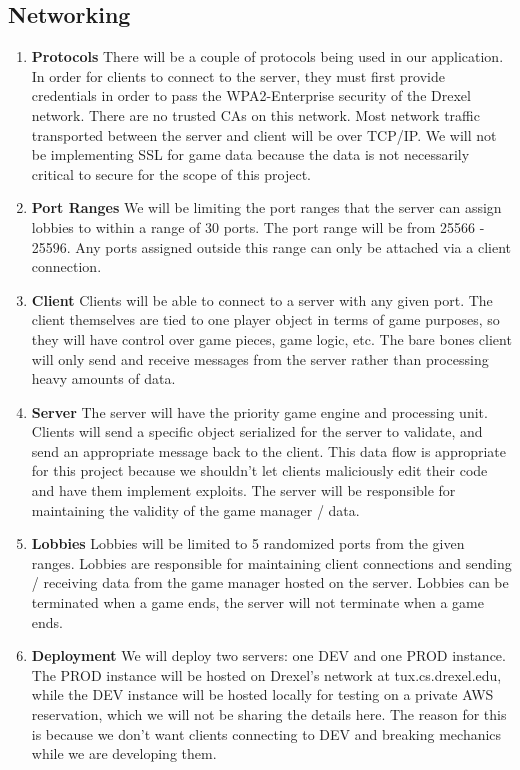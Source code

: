 \documentclass{scrreprt}
\begin{document}
		\subsection {Networking}
			\begin{enumerate} [label*=\arabic*.]
			\item \textbf{Protocols}
				There will be a couple of protocols being used in our application. In order for clients to connect to the server, they must first provide credentials in order to pass the WPA2-Enterprise security of the Drexel network. There are no trusted CAs on this network. 
				Most network traffic transported between the server and client will be over TCP/IP. We will not be implementing SSL for game data because the data is not necessarily critical to secure for the scope of this project.

			\item \textbf{Port Ranges}
				We will be limiting the port ranges that the server can assign lobbies to within a range of 30 ports. The port range will be from 25566 - 25596. Any ports assigned outside this range can only be attached via a client connection.

			\item \textbf{Client}
				Clients will be able to connect to a server with any given port. The client themselves are tied to one player object in terms of game purposes, so they will have control over game pieces, game logic, etc. The bare bones client will only send and receive messages from the server rather than processing heavy amounts of data. 

			\item \textbf{Server}
				The server will have the priority game engine and processing unit. Clients will send a specific object serialized for the server to validate, and send an appropriate message back to the client. This data flow is appropriate for this project because we shouldn't let clients maliciously edit their code and have them implement exploits. The server will be responsible for maintaining the validity of the game manager / data. 

			\item \textbf{Lobbies}
				Lobbies will be limited to 5 randomized ports from the given ranges. Lobbies are responsible for maintaining client connections and sending / receiving data from the game manager hosted on the server. Lobbies can be terminated when a game ends, the server will not terminate when a game ends. 

			\item \textbf{Deployment}
				We will deploy two servers: one DEV and one PROD instance. The PROD instance will be hosted on Drexel's network at tux.cs.drexel.edu, while the DEV instance will be hosted locally for testing on a private AWS reservation, which we will not be sharing the details here. The reason for this is because we don't want clients connecting to DEV and breaking mechanics while we are developing them. 
			\end{enumerate}
\end{document}
